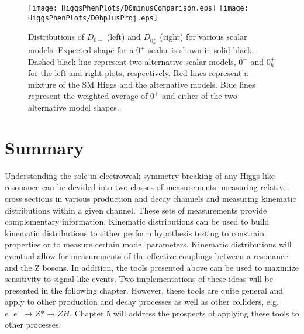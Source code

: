 \begin{figure}
\begin{center}
\texttt{[image: HiggsPhenPlots/D0minusComparison.eps]}
\texttt{[image: HiggsPhenPlots/D0hplusProj.eps]}
\caption{Distributions of $D_{0-}$ (left) and $D_{0_h^+}$ (right) for 
various scalar models.  Expected shape for a $0^+$ scalar is
shown in solid black.  Dashed black line represent two alternative
scalar models, $0^-$ and $0^+_h$ for the left and right plots,
respectively.  
Red lines represent a mixture of the SM Higgs and the alternative
models.  Blue lines represent the weighted average
of $0^+$ and either of the two alternative model shapes.}
\label{fig:fa3Comparison}
\end{center}
\end{figure}

\section{Summary}

Understanding the role in electroweak symmetry breaking of any 
Higgs-like resonance can be devided into two classes of
measurements: measuring relative cross sections in various 
production and decay channels and measuring kinematic distributions
within a given channel.  These sets of measurements provide
complementary information.  Kinematic distributions can be used
to build kinematic distributions to either perform hypothesis 
testing to constrain properties or to measure certain model
parameters.  Kinematic distributions will eventual
allow for measurements of the effective couplings between a 
resonance and the Z bosons. In addition, the tools presented above
can be used to maximize sensitivity to signal-like events.
Two implementations of these ideas will be presented in the 
following chapter. However, these tools are quite general and 
apply to other production and decay processes as well as other 
colliders, e.g. $e^+e^-\to Z*\to ZH$.  Chapter 5 will address 
the prospects of applying these tools to other processes.  
